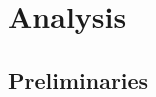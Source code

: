\section{Analysis}
\label{sec:analysis}


\subsection{Preliminaries}

\setlength{\textfloatsep}{5pt}
\renewcommand{\arraystretch}{1.15}
